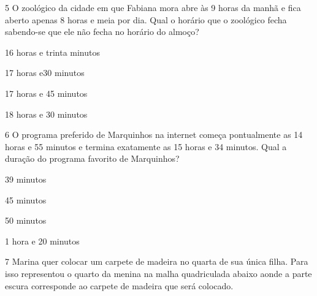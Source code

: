 
\num{5} O zoológico da cidade em que Fabiana mora abre às 9 horas da manhã
e fica aberto apenas 8 horas e meia por dia. Qual o horário que o
zoológico fecha sabendo-se que ele não fecha no horário do almoço?

\begin{escolha}
\item
  16 horas e trinta minutos
\item
  17 horas e30 minutos
\item
  17 horas e 45 minutos
\item
  18 horas e 30 minutos
\end{escolha}


\num{6} O programa preferido de Marquinhos na internet começa pontualmente
as 14 horas e 55 minutos e termina exatamente as 15 horas e 34 minutos.
Qual a duração do programa favorito de Marquinhos?

\begin{escolha}
\item
  39 minutos
\item
  45 minutos
\item
  50 minutos
\item
  1 hora e 20 minutos
\end{escolha}


\num{7} Marina quer colocar um carpete de madeira no quarta de sua única
filha. Para isso representou o quarto da menina na malha quadriculada
abaixo aonde a parte escura corresponde ao carpete de madeira que será
colocado.


